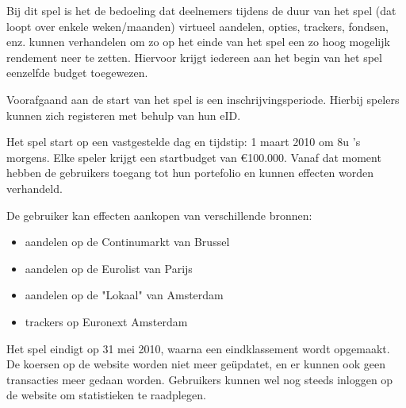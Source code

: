 Bij dit spel is het de bedoeling dat deelnemers tijdens de duur van het spel (dat loopt over enkele weken/maanden) virtueel aandelen, opties, trackers, fondsen, enz. kunnen verhandelen om zo op het einde van het spel een zo hoog mogelijk rendement neer te zetten. Hiervoor krijgt iedereen aan het begin van het spel eenzelfde budget toegewezen. 

Voorafgaand aan de start van het spel is een inschrijvingsperiode. Hierbij spelers kunnen zich registeren met behulp van hun eID. 

Het spel start op een vastgestelde dag en tijdstip: 1 maart 2010 om 8u 's morgens. Elke speler krijgt een startbudget van €100.000.
Vanaf dat moment hebben de gebruikers toegang tot hun portefolio en kunnen effecten worden verhandeld.

De gebruiker kan effecten aankopen van verschillende bronnen:
\begin{itemize}
\item{aandelen op de Continumarkt van Brussel}
\item{aandelen op de Eurolist van Parijs}
\item{aandelen op de "Lokaal" van Amsterdam}
\item{trackers op Euronext Amsterdam}
\end{itemize}

Het spel eindigt op 31 mei 2010, waarna een eindklassement wordt opgemaakt. De koersen op de website worden niet meer ge\"updatet, en er kunnen ook geen transacties meer gedaan worden. Gebruikers kunnen wel nog steeds inloggen op de website om statistieken te raadplegen.
